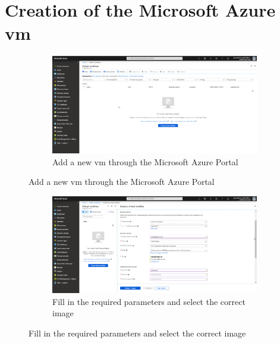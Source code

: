 \label{Containers_Azure}
\section{Creation of the Microsoft Azure \acrshort{vm}}
\begin{figure}[h]
	\begin{subfigure}{\textwidth}
		\captionsetup{width=0.9\linewidth}
		\includegraphics[width=\linewidth]{img/Methodologie/Containers5.png} 
		\centering
		\caption{Add a new \acrshort{vm} through the Microsoft Azure Portal}
	\end{subfigure}
\end{figure}
\begin{figure}[h]\ContinuedFloat
	\begin{subfigure}{\textwidth}
		\captionsetup{width=0.9\linewidth}
		\includegraphics[width=\linewidth]{img/Methodologie/Containers6.png}
		\centering
		\caption{Fill in the required parameters and select the correct image}
	\end{subfigure}
\end{figure}
